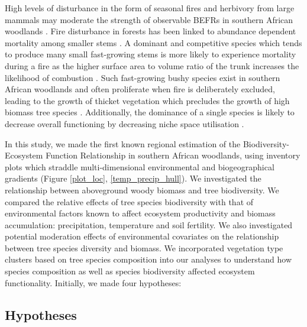 \documentclass[11pt,a4paper]{article}
\begin{document}
High levels of disturbance in the form of seasonal fires and herbivory from large mammals may moderate the strength of observable BEFRs in southern African woodlands \citep{Staver2009, Bond2005}. Fire disturbance in forests has been linked to abundance dependent mortality among smaller stems \citep{Roques2001}. A dominant and competitive species which tends to produce many small fast-growing stems is more likely to experience mortality during a fire as the higher surface area to volume ratio of the trunk increases the likelihood of combustion \citep{}. Such fast-growing bushy species exist in southern African woodlands and often proliferate when fire is deliberately excluded, leading to the growth of thicket vegetation which precludes the growth of high biomass tree species \citep{Higgins2007}. Additionally, the dominance of a single species is likely to decrease overall functioning by decreasing niche space utilisation \citep{Cardinale2002}.


In this study, we made the first known regional estimation of the Biodiversity-Ecosystem Function Relationship in southern African woodlands, using inventory plots which straddle multi-dimensional environmental and biogeographical gradients (Figure \autoref{plot_loc}, \autoref{temp_precip_hull}). We investigated the relationship between aboveground woody biomass and tree biodiversity. We compared the relative effects of tree species biodiversity with that of environmental factors known to affect ecosystem productivity and biomass accumulation: precipitation, temperature and soil fertility. We also investigated potential moderation effects of environmental covariates on the relationship between tree species diversity and biomass. We incorporated vegetation type clusters based on tree species composition \citep{} into our analyses to understand how species composition as well as species biodiversity affected ecosystem functionality. Initially, we made four hypotheses: 

\subsection{Hypotheses}
\end{document}
